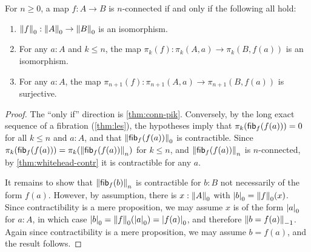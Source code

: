 \begin{cor}\label{thm:pik-conn}
  For $n\ge 0$, a map $f:A\to B$ is $n$-connected if and only if the following all hold:
  \begin{enumerate}
  \item $\trunc0f:\trunc0A \to \trunc0B$ is an isomorphism.
  \item For any $a:A$ and $k\le n$, the map $\pi_k(f):\pi_k(A,a) \to \pi_k(B,f(a))$ is an isomorphism.
  \item For any $a:A$, the map $\pi_{n+1}(f):\pi_{n+1}(A,a) \to \pi_{n+1}(B,f(a))$ is surjective.
  \end{enumerate}
\end{cor}
\begin{proof}
  The ``only if'' direction is \cref{thm:conn-pik}.
  Conversely, by the long exact sequence of a fibration (\cref{thm:les}),
  the hypotheses imply that $\pi_k(\hfib f {f(a)})=0$ for all $k\le n$ and $a:A$, and that $\trunc 0{\hfib f{f(a)}}$ is contractible.
  Since $\pi_k(\hfib f {f(a)}) = \pi_k(\trunc n{\hfib f{f(a)}})$ for $k\le n$, and $\trunc n{\hfib f{f(a)}}$ is $n$-connected, by \cref{thm:whitehead-contr} it is contractible for any $a$.

  It remains to show that $\trunc n{\hfib f{b}}$ is contractible for $b:B$ not necessarily of the form $f(a)$.
  However, by assumption, there is $x:\trunc0A$ with $\tproj 0b = \trunc0f(x)$.
  Since contractibility is a mere proposition, we may assume $x$ is of the form $\tproj0a$ for $a:A$, in which case $\tproj 0 b = \trunc0f(\tproj0a) = \tproj0{f(a)}$, and therefore $\trunc{-1}{b=f(a)}$.
  Again since contractibility is a mere proposition, we may assume $b=f(a)$, and the result follows.
\end{proof}

